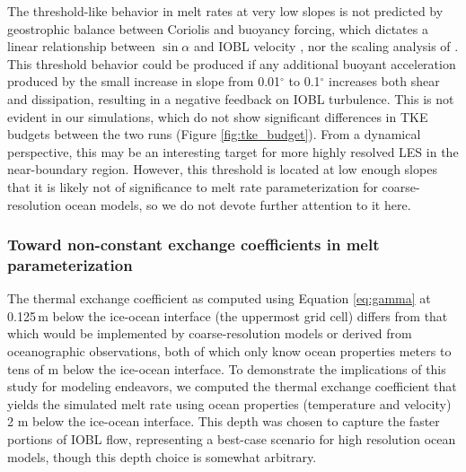 \documentclass[draft]{styles/agujournal2019}
\begin{document}
The threshold-like behavior in melt rates at very low slopes is not predicted by geostrophic balance between Coriolis and buoyancy forcing, which dictates a linear relationship between $\sin\alpha$ and IOBL velocity \cite{jenkins_simple_2016}, nor the scaling analysis of . This threshold behavior could be produced if any additional buoyant acceleration produced by the small increase in slope from 0.01$^{\circ}$ to 0.1$^{\circ}$ increases both shear and dissipation, resulting in a negative feedback on IOBL turbulence. This is not evident in our simulations, which do not show significant differences in TKE budgets between the two runs (Figure \ref{fig:tke_budget}). From a dynamical perspective, this may be an interesting target for more highly resolved LES in the near-boundary region. However, this threshold is located at low enough slopes that it is likely not of significance to melt rate parameterization for coarse-resolution ocean models, so we do not devote further attention to it here. 


\subsubsection{Toward non-constant exchange coefficients in melt parameterization}\label{disc:prm_gamma}

The thermal exchange coefficient as computed using Equation \ref{eq:gamma} at 0.125\,m below the ice-ocean interface (the uppermost grid cell) differs from that which would be implemented by coarse-resolution models or derived from oceanographic observations, both of which only know ocean properties meters to tens of m below the ice-ocean interface. To demonstrate the implications of this study for modeling endeavors, we computed the thermal exchange coefficient that yields the simulated melt rate using ocean properties (temperature and velocity) 2 m below the ice-ocean interface. This depth was chosen to capture the faster portions of IOBL flow, representing a best-case scenario for high resolution ocean models, though this depth choice is somewhat arbitrary. 
\end{document}
